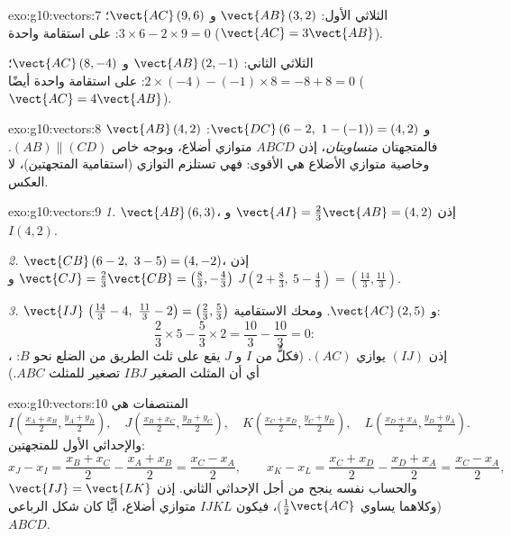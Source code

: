 \begin{solution}{exo:g10:vectors:7}
الثلاثي الأول: $\vect{AB}\,(3, 2)$ و $\vect{AC}\,(9, 6)$؛
$3 \times 6 - 2 \times 9 = 0$: على استقامة واحدة ($\vect{AC} = 3\vect{AB}$).

الثلاثي الثاني: $\vect{AB}\,(2, -1)$ و $\vect{AC}\,(8, -4)$؛
$2 \times (-4) - (-1) \times 8 = -8 + 8 = 0$: على استقامة واحدة أيضًا
($\vect{AC} = 4\vect{AB}$).
\end{solution}

\begin{solution}{exo:g10:vectors:8}
$\vect{AB}\,(4, 2)$ و $\vect{DC}\,(6-2,\ 1-(-1)) = (4, 2)$: فالمتجهتان
\emph{متساويتان}، إذن $ABCD$ متوازي أضلاع، وبوجه خاص
$(AB) \parallel (CD)$. وخاصية متوازي الأضلاع هي الأقوى: فهي
تستلزم التوازي (استقامية المتجهتين)، لا العكس.
\end{solution}

\begin{solution}{exo:g10:vectors:9}
\emph{1.} $\vect{AB}\,(6, 3)$، إذن
$\vect{AI} = \frac23\vect{AB} = (4, 2)$ و $I(4, 2)$.

\emph{2.} $\vect{CB}\,(6-2,\ 3-5) = (4, -2)$، إذن
$\vect{CJ} = \frac23\vect{CB} = \left(\frac83, -\frac43\right)$ و
$J\left(2 + \frac83,\ 5 - \frac43\right) = \left(\frac{14}{3},
\frac{11}{3}\right)$.

\emph{3.} $\vect{IJ}\,\left(\frac{14}{3} - 4,\ \frac{11}{3} - 2\right) =
\left(\frac23, \frac53\right)$ و $\vect{AC}\,(2, 5)$. ومحك
الاستقامية:
\[
\frac23 \times 5 - \frac53 \times 2 = \frac{10}{3} - \frac{10}{3} = 0 :
\]
، إذن $(IJ)$ يوازي $(AC)$. (فكلٌّ من $I$ و
$J$ يقع على ثلث الطريق من الضلع نحو $B$: أي أن المثلث
الصغير $IBJ$ تصغير للمثلث $ABC$.)
\end{solution}

\begin{solution}{exo:g10:vectors:10}
المنتصفات هي
\[
I\left(\tfrac{x_A + x_B}{2}, \tfrac{y_A + y_B}{2}\right), \quad
J\left(\tfrac{x_B + x_C}{2}, \tfrac{y_B + y_C}{2}\right), \quad
K\left(\tfrac{x_C + x_D}{2}, \tfrac{y_C + y_D}{2}\right), \quad
L\left(\tfrac{x_D + x_A}{2}, \tfrac{y_D + y_A}{2}\right).
\]
والإحداثي الأول للمتجهتين:
\[
x_J - x_I = \frac{x_B + x_C}{2} - \frac{x_A + x_B}{2}
= \frac{x_C - x_A}{2},
\qquad
x_K - x_L = \frac{x_C + x_D}{2} - \frac{x_D + x_A}{2}
= \frac{x_C - x_A}{2},
\]
والحساب نفسه ينجح من أجل الإحداثي الثاني. إذن
$\vect{IJ} = \vect{LK}$ (وكلاهما يساوي $\frac12\vect{AC}$)، فيكون $IJKL$
متوازي أضلاع، أيًّا كان شكل الرباعي $ABCD$.
\end{solution}

